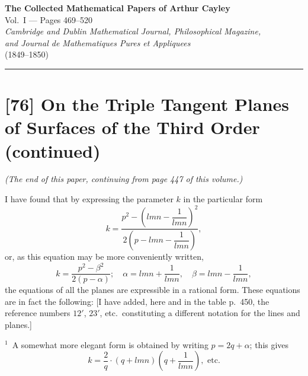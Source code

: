 \documentclass[12pt,a4paper]{article}
\begin{document}
\begin{center}
{\Large\textbf{The Collected Mathematical Papers of Arthur Cayley}}\\[6pt]
{\large Vol.~I --- Pages 469--520}\\[12pt]
\textit{Cambridge and Dublin Mathematical Journal, Philosophical Magazine,}\\
\textit{and Journal de Mathematiques Pures et Appliquees}\\
(1849--1850)
\end{center}

\hrule
\bigskip

\section*{[76] On the Triple Tangent Planes of Surfaces of the Third Order (continued)}

\bigskip

\noindent\textit{(The end of this paper, continuing from page 447 of this volume.)}
\medskip

I have found that by expressing the parameter $k$ in the particular form
\[
k = \frac{p^2 - \left(lmn - \dfrac{1}{lmn}\right)^2}{2\left(p - lmn - \dfrac{1}{lmn}\right)},
\]
or, as this equation may be more conveniently written,
\begin{equation}
k = \frac{p^2 - \beta^2}{2(p - \alpha)}; \quad \alpha = lmn + \frac{1}{lmn}, \quad \beta = lmn - \frac{1}{lmn},\tag{1}
\end{equation}
the equations of all the planes are expressible in a rational form. These equations are in fact the following: [I have added, here and in the table p.~450, the reference numbers $12'$, $23'$, etc.\ constituting a different notation for the lines and planes.]
\medskip

\noindent$^1$~A somewhat more elegant form is obtained by writing $p = 2q + \alpha$; this gives
\[
k = \frac{2}{q} \cdot (q + lmn)\left(q + \frac{1}{lmn}\right), \text{ etc.}
\]
\medskip
\end{document}
